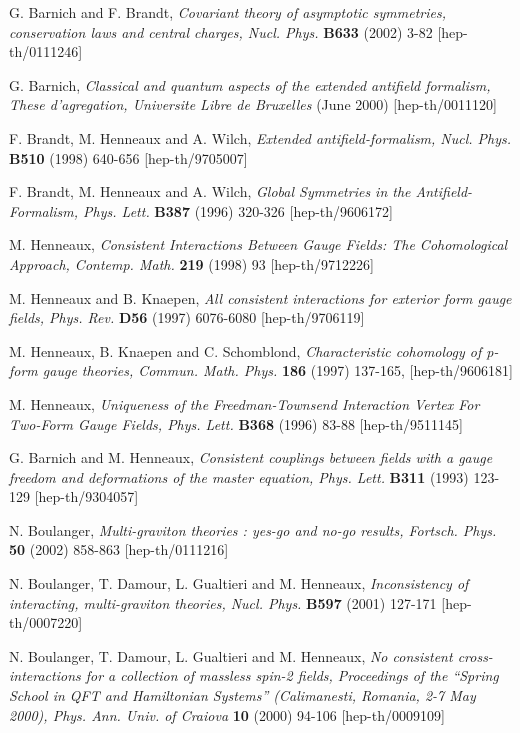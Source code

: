 \documentclass[a4paper,12pt]{article}
\begin{document}
\begin{thebibliography}{99}
  G. Barnich and F. Brandt, \textit{Covariant theory of
asymptotic symmetries, conservation laws and central charges, Nucl. Phys.} 
\textbf{B633} (2002) 3-82 [hep-th/0111246]

  G. Barnich, \textit{Classical and quantum aspects of the
extended antifield formalism, These d'agregation, Universite Libre de
Bruxelles} (June 2000) [hep-th/0011120]

  F. Brandt, M. Henneaux and A. Wilch, \textit{Extended
antifield-formalism, Nucl. Phys.} \textbf{B510} (1998) 640-656
[hep-th/9705007]

  F. Brandt, M. Henneaux and A. Wilch, \textit{Global
Symmetries in the Antifield-Formalism, Phys. Lett.} \textbf{B387} (1996)
320-326 [hep-th/9606172]

  M. Henneaux, \textit{Consistent Interactions Between Gauge
Fields: The Cohomological Approach, Contemp. Math.} \textbf{219} (1998) 93
[hep-th/9712226]

  M. Henneaux and B. Knaepen, \textit{All consistent
interactions for exterior form gauge fields, Phys. Rev.} \textbf{D56} (1997)
6076-6080 [hep-th/9706119]

  M. Henneaux, B. Knaepen and C. Schomblond, \textit{%
Characteristic cohomology of p-form gauge theories, Commun. Math. Phys.} 
\textbf{186} (1997) 137-165, [hep-th/9606181]

  M. Henneaux, \textit{Uniqueness of the Freedman-Townsend
Interaction Vertex For Two-Form Gauge Fields, Phys. Lett.} \textbf{B368}
(1996) 83-88 [hep-th/9511145]

  G. Barnich and M. Henneaux, \textit{Consistent couplings
between fields with a gauge freedom and deformations of the master equation,
Phys. Lett.} \textbf{B311} (1993) 123-129 [hep-th/9304057]

  N. Boulanger, \textit{Multi-graviton theories : yes-go and
no-go results, Fortsch. Phys.} \textbf{50} (2002) 858-863 [hep-th/0111216]

  N. Boulanger, T. Damour, L. Gualtieri and M. Henneaux, 
\textit{Inconsistency of interacting, multi-graviton theories, Nucl. Phys.} 
\textbf{B597} (2001) 127-171 [hep-th/0007220]

  N. Boulanger, T. Damour, L. Gualtieri and M. Henneaux, 
\textit{No consistent cross-interactions for a collection of massless spin-2
fields, Proceedings of the ``Spring School in QFT and Hamiltonian Systems''
(Calimanesti, Romania, 2-7 May 2000), Phys. Ann. Univ. of Craiova} \textbf{10%
} (2000) 94-106 [hep-th/0009109]


\end{thebibliography}
\end{document}
